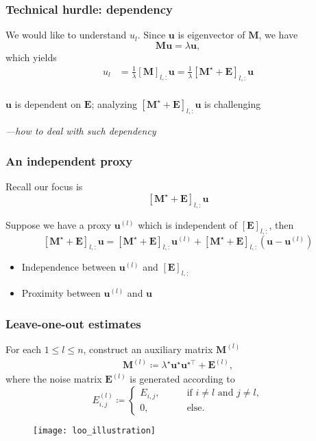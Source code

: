 \documentclass[compress,
mathserif,wide,%
]{beamer}
\begin{document}
\begin{frame}
	\frametitle{Technical hurdle: dependency}
	We would like to understand $u_{l}$. Since $\bm{u}$ is eigenvector of $\bm{M}$, we have
	\[
	\bm{M} \bm{u} = \lambda \bm{u},
	\]
	which yields 
	\begin{align*}
	u_l & = \frac{1}{\lambda} [\bm{M}]_{l, :} \bm{u} = \frac{1}{\lambda} [\bm{M}^{\star} + \bm{E} ]_{l, :} \bm{u} \\
	\end{align*}
	
{

\begin{varblock}[\textwidth]{}
\begin{center}
	$\bm{u}$ is dependent on $\bm{E}$; analyzing $[\bm{M}^{\star} + \bm{E} ]_{l, :} \bm{u}$ is challenging
\end{center}
\end{varblock}
}
{\hfill \em ---how to deal with such dependency}
\end{frame}

\begin{frame}
	\frametitle{An independent proxy}
	Recall our focus is 
	\[
	[\bm{M}^{\star} + \bm{E} ]_{l, :} \bm{u}
	\]
	
	\vfill 
	Suppose we have a proxy $\bm{u}^{(l)}$ which is \alert{independent} of $[ \bm{E} ] _{l, :}$, then 
	\[
	[\bm{M}^{\star} + \bm{E} ]_{l, :} \bm{u} = [\bm{M}^{\star} + \bm{E} ]_{l, :} \bm{u}^{(l)} + [\bm{M}^{\star} + \bm{E} ]_{l, :} \left ( \bm{u} - \bm{u}^{(l)} \right )
	\]
	
	\begin{itemize}
		\item Independence between $\bm{u}^{(l)}$ and $[ \bm{E} ] _{l, :}$
		\item Proximity between $\bm{u}^{(l)}$ and $\bm{u}$
	\end{itemize}
\end{frame}

\begin{frame}
	\frametitle{Leave-one-out estimates}
	For each $1\leq l\leq n$, construct an auxiliary matrix  $\bm{M}^{(l)}$ 
\begin{align*}
	\bm{M}^{(l)} \coloneqq \lambda^{\star}\bm{u}^{\star}\bm{u}^{\star\top}+\bm{E}^{(l)} , 
\end{align*}
%
where the noise matrix $\bm{E}^{(l)}$ is generated according to
%
\begin{equation*}
E_{i,j}^{(l)} \coloneqq
\begin{cases}
E_{i,j},\qquad & \text{if }i\neq l\text{ and }j\neq l, \\
0, & \text{else}.
\end{cases}
\end{equation*}

\vspace{-1em}
	\begin{figure}[t]
\begin{center}
\texttt{[image: loo\_illustration]}
\end{center}
\end{figure}
\end{frame}
\end{document}
